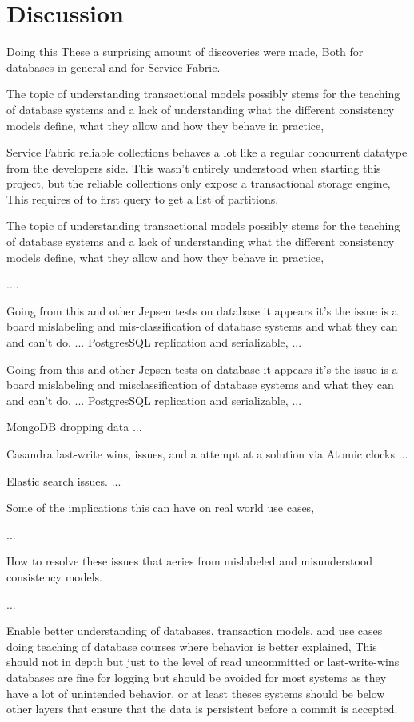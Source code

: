 \documentclass[a4paper,10pt,titlepage]{report}
\begin{document}
\chapter{Discussion}


Doing this These a surprising amount of discoveries were made, Both for databases in general and for Service Fabric.




The topic of understanding transactional models possibly stems for the teaching of database systems and a lack of understanding what the different consistency models define, what they allow and how they behave in practice,


Service Fabric reliable collections behaves a lot like a regular concurrent datatype from the developers side. This wasn't entirely understood when starting this project, but the reliable collections only expose a transactional storage engine, This requires of to first query to get a list of partitions.
    
    

The topic of understanding transactional models possibly stems for the teaching of database systems and a lack of understanding what the different consistency models define, what they allow and how they behave in practice,

....

Going from this and other Jepsen tests on database it appears it's the issue is a board mislabeling and mis-classification of database systems and what they can and can't do.
...
PostgresSQL replication and serializable,
...

Going from this and other Jepsen tests on database it appears it's the issue is a board mislabeling and misclassification of database systems and what they can and can't do.
...
PostgresSQL replication and serializable,
...

MongoDB dropping data
...

Casandra last-write wins, issues, and a attempt at a solution via Atomic clocks
...

Elastic search issues.
...

Some of the implications this can have on real world use cases,

...

How to resolve these issues that aeries from mislabeled and misunderstood consistency models.

...

Enable better understanding of databases, transaction models, and use cases doing teaching of database courses where behavior is better explained, This should not in depth but just to the level of read uncommitted or last-write-wins databases are fine for logging but should be avoided for most systems as they have a lot of unintended behavior, or at least theses systems should be below other layers that ensure that the data is persistent before a commit is accepted.
\end{document}
